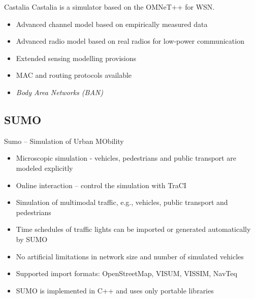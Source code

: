 \documentclass{beamer}
\begin{document}
\begin{frame}

\begin{block}{Castalia}
Castalia is a simulator based on the OMNeT++ for WSN.
	\begin{itemize}
		\item Advanced channel model based on empirically measured data
		\item Advanced radio model based on real radios for low-power communication
		\item Extended sensing modelling provisions
		\item MAC and routing protocols available
		\item \textit{Body Area Networks (BAN)}
	\end{itemize}
\end{block}
\end{frame}

\subsection{SUMO}

\begin{frame}

\begin{block}{Sumo -- Simulation of Urban MObility}

	\begin{itemize}
		\item Microscopic simulation - vehicles, pedestrians and public transport are modeled explicitly
		\item Online interaction – control the simulation with TraCI
		\item Simulation of multimodal traffic, e.g., vehicles, public transport and pedestrians
		\item Time schedules of traffic lights can be imported or generated automatically by SUMO
		\item No artificial limitations in network size and number of simulated vehicles
		\item Supported import formats: OpenStreetMap, VISUM, VISSIM, NavTeq
		\item SUMO is implemented in C++ and uses only portable libraries
	\end{itemize}

\end{block}
\end{frame}

\begin{frame}

\end{frame}
\end{document}
